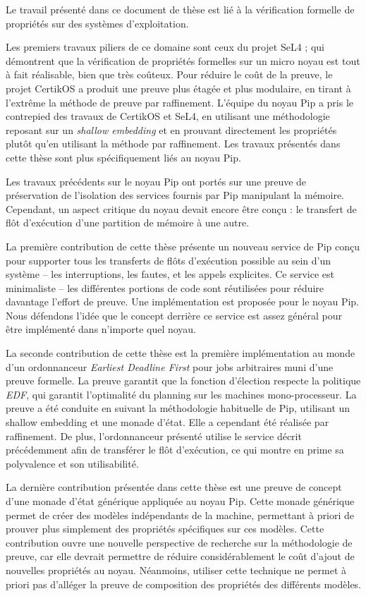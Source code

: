 
Le travail présenté dans ce document de thèse est lié à la vérification formelle de propriétés sur des systèmes d'exploitation.

Les premiers travaux piliers de ce domaine sont ceux du projet SeL4 ; qui démontrent que la vérification de propriétés formelles sur un micro noyau est tout à fait réalisable, bien que très coûteux. Pour réduire le coût de la preuve, le projet CertikOS a produit une preuve plus étagée et plus modulaire, en tirant à l'extrême la méthode de preuve par raffinement. L'équipe du noyau Pip a pris le contrepied des travaux de CertikOS et SeL4, en utilisant une méthodologie reposant sur un \emph{shallow embedding} et en prouvant directement les propriétés plutôt qu'en utilisant la méthode par raffinement.
Les travaux présentés dans cette thèse sont plus spécifiquement liés au noyau Pip.

Les travaux précédents sur le noyau Pip ont portés sur une preuve de préservation de l'isolation des services fournis par Pip manipulant la mémoire. Cependant, un aspect critique du noyau devait encore être conçu : le transfert de flôt d'exécution d'une partition de mémoire à une autre.

La première contribution de cette thèse présente un nouveau service de Pip conçu pour supporter tous les transferts de flôts d'exécution possible au sein d'un système -- les interruptions, les fautes, et les appels explicites. Ce service est minimaliste -- les différentes portions de code sont réutilisées pour réduire davantage l'effort de preuve. Une implémentation est proposée pour le noyau Pip. Nous défendons l'idée que le concept derrière ce service est assez général pour être implémenté dans n'importe quel noyau.

La seconde contribution de cette thèse est la première implémentation au monde d'un ordonnanceur \emph{Earliest Deadline First} pour jobs arbitraires muni d'une preuve formelle. La preuve garantit que la fonction d'élection respecte la politique \emph{EDF}, qui garantit l'optimalité du planning sur les machines mono-processeur. La preuve a été conduite en suivant la méthodologie habituelle de Pip, utilisant un shallow embedding et une monade d'état. Elle a cependant été réalisée par raffinement. De plus, l'ordonnanceur présenté utilise le service décrit précédemment afin de transférer le flôt d'exécution, ce qui montre en prime sa polyvalence et son utilisabilité.

La dernière contribution présentée dans cette thèse est une preuve de concept d'une monade d'état générique appliquée au noyau Pip. Cette monade générique permet de créer des modèles indépendants de la machine, permettant à priori de prouver plus simplement des propriétés spécifiques sur ces modèles. Cette contribution ouvre une nouvelle perspective de recherche sur la méthodologie de preuve, car elle devrait permettre de réduire considérablement le coût d'ajout de nouvelles propriétés au noyau. Néanmoins, utiliser cette technique ne permet à priori pas d'alléger la preuve de composition des propriétés des différents modèles.
